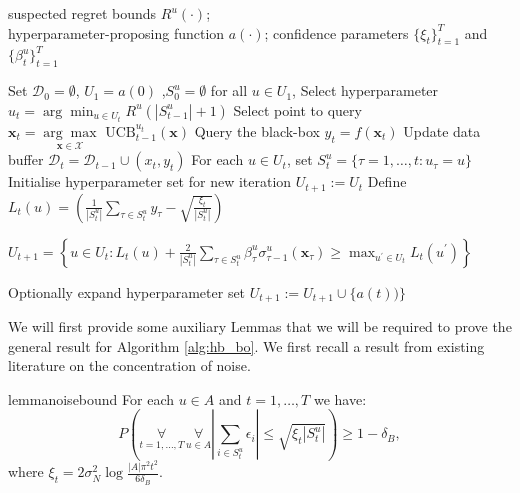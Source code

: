 \documentclass{article}
\theoremstyle{plain}
\theoremstyle{definition}
\theoremstyle{remark}
\theoremstyle{plain}
\begin{document}
\begin{algorithm}
\caption{Hyperparameter Balancing GP-UCB }\label{alg:hb_bo}
\begin{algorithmic}[1]
\REQUIRE  suspected regret bounds $R^u(\cdot)$; \\ hyperparameter-proposing function $a(\cdot)$;
confidence parameters $\{\xi_t\}_{t=1}^T$ and
$\{\beta^u_t\}_{t=1}^T$ 

\STATE Set $\mathcal{D}_{0} = \emptyset$, $U_1 = a(0)$ ,$S^u_0 = \emptyset$ for all $u \in U_1$,  
\STATE Select hyperparameter  $u_t = \arg\min_{u \in U_t} R^u(|S_{t-1}^{u}| + 1)$
\STATE Select point to query $\bm{x}_t =  \underset{\bm{x} \in \mathcal{X}}{\arg\max} \textrm{ UCB}_{t-1}^{u_t}(\bm{x})$
\STATE Query the black-box $y_t = f(\bm{x}_t)$ 
\STATE Update data buffer $\mathcal{D}_t = \mathcal{D}_{t-1} \cup (x_t, y_t)$
\STATE For each $u \in U_{t}$, set $S_t^{u} = \{\tau  = 1,\dots, t: u_{\tau} = u\}$
\STATE Initialise hyperparameter set for new iteration $U_{t+1} := U_{t}$
\STATE Define $L_t(u) = \left( \frac{1}{|S_t^{u}|} \sum_{\tau \in S_t^{u}}y_{\tau} - \sqrt{\frac{\xi_{t}}{|S_{t}^{u}|}} \right)$

\STATE $U_{t+1} = \left\{ u \in U_t: L_t(u) +  \frac{2}{|S_t^{u}|} \sum_{\tau \in S_t^u} \beta_\tau^u \sigma^u_{\tau-1}(\bm{x}_\tau)  \ge  \max_{u^\prime \in U_{t}} L_t(u^\prime) \right\}$

\ENDIF

\STATE Optionally expand hyperparameter set $U_{t+1} := U_{t+1} \cup \{a(t))\}$
\ENDFOR

\end{algorithmic}
\end{algorithm}

We will first provide some auxiliary Lemmas that we will be required to prove the general result for Algorithm \ref{alg:hb_bo}. We first recall a result from existing literature on the concentration of noise.

\begin{restatable}{lemma}{noisebound}
\label{lemma:noisebound}
For each $u \in A$ and $t=1,\dots,T$ we have:
\begin{equation*}
    P \left( \underset{t= 1,\dots, T}{\forall} \, \underset{u \in A}{\forall} \left | \sum_{i \in S_t^u} \epsilon_i \right| \le \sqrt{\xi_t |S_t^u|} \right) \ge 1 - \delta_B ,
\end{equation*}
where $\xi_t = 2 \sigma_N^2 \log \frac{|A|\pi^2 t^2}{6\delta_B}$.
\end{restatable}
\end{document}
